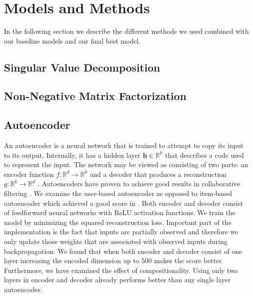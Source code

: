\documentclass[10pt,conference,compsocconf]{IEEEtran}
\begin{document}
    \section{Models and Methods}
    In the following section we describe the different methods we used combined with our baseline models and our final best model.



    \subsection{Singular Value Decomposition}

    \subsection{Non-Negative Matrix Factorization}

    \subsection{Autoencoder}
    An autoencoder is a neural network that is trained to attempt to copy its input to its output.
    Internally, it has a hidden layer $\textbf{h} \in \mathbb{R}^k$ that describes a code used to represent the input.
    The network may be viewed as consisting of two parts: an encoder function $f: \mathbb{R} ^d \rightarrow \mathbb{R} ^k$ and a
    decoder that produces a reconstruction $g: \mathbb{R} ^k \rightarrow \mathbb{R} ^d$ \cite{Goodfellow-et-al-2016}. Autoencoders
    have proven to achieve good results in collaborative filtering \cite{inproceedings}. We examine the user-based
    autoencoder as opposed to item-based autoencoder which achieved a good score in \cite{inproceedings}. Both encoder
    and decoder consist of feedforward neural networks with ReLU activation functions. We train the model by minimizing
    the squared reconstruction loss. Important part of the implementation is the fact that inputs are partially observed
    and therefore we only update those weights that are associated with observed inputs during backpropagation.
    We found that when both encoder and decoder consist of one layer increasing the encoded dimension up to 500 makes
    the score better. Furthermore, we have examined the effect of compositionality. Using only two layers in encoder
    and decoder already performs better than any single layer autoencoder.
\end{document}
